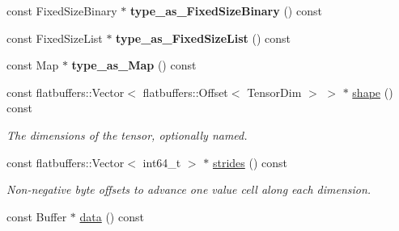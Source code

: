\begin{DoxyCompactItemize}
\item 
const Fixed\+Size\+Binary $\ast$ {\bfseries type\+\_\+as\+\_\+\+Fixed\+Size\+Binary} () const \hypertarget{structorg_1_1apache_1_1arrow_1_1flatbuf_1_1FLATBUFFERS__FINAL__CLASS_aa23f44e7388779ffb96cd989b91f659d}{}\label{structorg_1_1apache_1_1arrow_1_1flatbuf_1_1FLATBUFFERS__FINAL__CLASS_aa23f44e7388779ffb96cd989b91f659d}

\item 
const Fixed\+Size\+List $\ast$ {\bfseries type\+\_\+as\+\_\+\+Fixed\+Size\+List} () const \hypertarget{structorg_1_1apache_1_1arrow_1_1flatbuf_1_1FLATBUFFERS__FINAL__CLASS_a161f11c2cee3eda3e8f7903bee014f82}{}\label{structorg_1_1apache_1_1arrow_1_1flatbuf_1_1FLATBUFFERS__FINAL__CLASS_a161f11c2cee3eda3e8f7903bee014f82}

\item 
const Map $\ast$ {\bfseries type\+\_\+as\+\_\+\+Map} () const \hypertarget{structorg_1_1apache_1_1arrow_1_1flatbuf_1_1FLATBUFFERS__FINAL__CLASS_a6463946691f7425cb114046c6cac6562}{}\label{structorg_1_1apache_1_1arrow_1_1flatbuf_1_1FLATBUFFERS__FINAL__CLASS_a6463946691f7425cb114046c6cac6562}

\item 
const flatbuffers\+::\+Vector$<$ flatbuffers\+::\+Offset$<$ Tensor\+Dim $>$ $>$ $\ast$ \hyperlink{structorg_1_1apache_1_1arrow_1_1flatbuf_1_1FLATBUFFERS__FINAL__CLASS_af8976c9e3e21335bfc564f75b631f7a5}{shape} () const \hypertarget{structorg_1_1apache_1_1arrow_1_1flatbuf_1_1FLATBUFFERS__FINAL__CLASS_af8976c9e3e21335bfc564f75b631f7a5}{}\label{structorg_1_1apache_1_1arrow_1_1flatbuf_1_1FLATBUFFERS__FINAL__CLASS_af8976c9e3e21335bfc564f75b631f7a5}

\begin{DoxyCompactList}\small\item\em The dimensions of the tensor, optionally named. \end{DoxyCompactList}\item 
const flatbuffers\+::\+Vector$<$ int64\+\_\+t $>$ $\ast$ \hyperlink{structorg_1_1apache_1_1arrow_1_1flatbuf_1_1FLATBUFFERS__FINAL__CLASS_aa5d22ebb288b2e3d7692278dd726cc96}{strides} () const \hypertarget{structorg_1_1apache_1_1arrow_1_1flatbuf_1_1FLATBUFFERS__FINAL__CLASS_aa5d22ebb288b2e3d7692278dd726cc96}{}\label{structorg_1_1apache_1_1arrow_1_1flatbuf_1_1FLATBUFFERS__FINAL__CLASS_aa5d22ebb288b2e3d7692278dd726cc96}

\begin{DoxyCompactList}\small\item\em Non-\/negative byte offsets to advance one value cell along each dimension. \end{DoxyCompactList}\item 
const Buffer $\ast$ \hyperlink{structorg_1_1apache_1_1arrow_1_1flatbuf_1_1FLATBUFFERS__FINAL__CLASS_aae5b551dd7fe7a072099b7a3b4d47e73}{data} () const \hypertarget{structorg_1_1apache_1_1arrow_1_1flatbuf_1_1FLATBUFFERS__FINAL__CLASS_aae5b551dd7fe7a072099b7a3b4d47e73}{}\label{structorg_1_1apache_1_1arrow_1_1flatbuf_1_1FLATBUFFERS__FINAL__CLASS_aae5b551dd7fe7a072099b7a3b4d47e73}


\end{DoxyCompactItemize}
